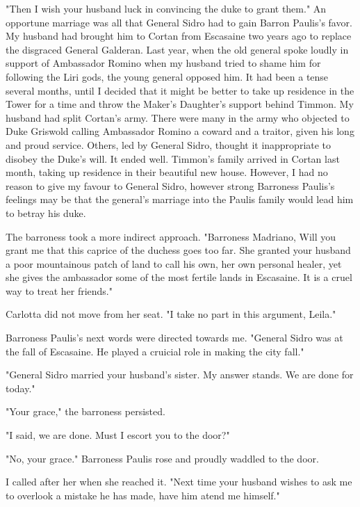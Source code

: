 \documentclass{article}
\begin{document}
"Then I wish your husband luck in convincing the duke to grant them." An opportune marriage was all that General Sidro had to gain Barron Paulis's favor. My husband had brought him to Cortan from Escasaine two years ago to replace the disgraced General Galderan. Last year, when the old general spoke loudly in support of Ambassador Romino when my husband tried to shame him for following the Liri gods, the young general opposed him. It had been a tense several months, until I decided that it might be better to take up residence in the Tower for a time and throw the Maker's Daughter's support behind Timmon. My husband had split Cortan's army. There were many in the army who objected to Duke Griswold calling Ambassador Romino a coward and a traitor, given his long and proud service. Others, led by General Sidro, thought it inappropriate to disobey the Duke's will. It ended well. Timmon's family arrived in Cortan last month, taking up residence in their beautiful new house. However, I had no reason to give my favour to General Sidro, however strong Barroness Paulis's feelings may be that the general's marriage into the Paulis family would lead him to betray his duke.

The barroness took a more indirect approach. "Barroness Madriano, Will you grant me that this caprice of the duchess goes too far. She granted your husband a poor mountainous patch of land to call his own, her own personal healer, yet she gives the ambassador some of the most fertile lands in Escasaine. It is a cruel way to treat her friends."

Carlotta did not move from her seat. "I take no part in this argument, Leila."

Barroness Paulis's next words were directed towards me. "General Sidro was at the fall of Escasaine. He played a cruicial role in making the city fall."

"General Sidro married your husband's sister. My answer stands. We are done for today."

"Your grace," the barroness persisted. 

"I said, we are done. Must I escort you to the door?"

"No, your grace." Barroness Paulis rose and proudly waddled to the door. 

I called after her when she reached it. "Next time your husband wishes to ask me to overlook a mistake he has made, have him atend me himself."
\end{document}
